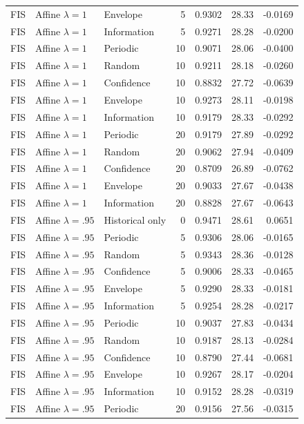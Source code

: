 \begin{longtable}{lllrrrr}
FIS & Affine $\lambda=1$ & Envelope & 5 & 0.9302 & 28.33 & -0.0169 \\
FIS & Affine $\lambda=1$ & Information & 5 & 0.9271 & 28.28 & -0.0200 \\
FIS & Affine $\lambda=1$ & Periodic & 10 & 0.9071 & 28.06 & -0.0400 \\
FIS & Affine $\lambda=1$ & Random & 10 & 0.9211 & 28.18 & -0.0260 \\
FIS & Affine $\lambda=1$ & Confidence & 10 & 0.8832 & 27.72 & -0.0639 \\
FIS & Affine $\lambda=1$ & Envelope & 10 & 0.9273 & 28.11 & -0.0198 \\
FIS & Affine $\lambda=1$ & Information & 10 & 0.9179 & 28.33 & -0.0292 \\
FIS & Affine $\lambda=1$ & Periodic & 20 & 0.9179 & 27.89 & -0.0292 \\
FIS & Affine $\lambda=1$ & Random & 20 & 0.9062 & 27.94 & -0.0409 \\
FIS & Affine $\lambda=1$ & Confidence & 20 & 0.8709 & 26.89 & -0.0762 \\
FIS & Affine $\lambda=1$ & Envelope & 20 & 0.9033 & 27.67 & -0.0438 \\
FIS & Affine $\lambda=1$ & Information & 20 & 0.8828 & 27.67 & -0.0643 \\
FIS & Affine $\lambda=.95$ & Historical only & 0 & 0.9471 & 28.61 & 0.0651 \\
FIS & Affine $\lambda=.95$ & Periodic & 5 & 0.9306 & 28.06 & -0.0165 \\
FIS & Affine $\lambda=.95$ & Random & 5 & 0.9343 & 28.36 & -0.0128 \\
FIS & Affine $\lambda=.95$ & Confidence & 5 & 0.9006 & 28.33 & -0.0465 \\
FIS & Affine $\lambda=.95$ & Envelope & 5 & 0.9290 & 28.33 & -0.0181 \\
FIS & Affine $\lambda=.95$ & Information & 5 & 0.9254 & 28.28 & -0.0217 \\
FIS & Affine $\lambda=.95$ & Periodic & 10 & 0.9037 & 27.83 & -0.0434 \\
FIS & Affine $\lambda=.95$ & Random & 10 & 0.9187 & 28.13 & -0.0284 \\
FIS & Affine $\lambda=.95$ & Confidence & 10 & 0.8790 & 27.44 & -0.0681 \\
FIS & Affine $\lambda=.95$ & Envelope & 10 & 0.9267 & 28.17 & -0.0204 \\
FIS & Affine $\lambda=.95$ & Information & 10 & 0.9152 & 28.28 & -0.0319 \\
FIS & Affine $\lambda=.95$ & Periodic & 20 & 0.9156 & 27.56 & -0.0315 \\

\end{longtable}
